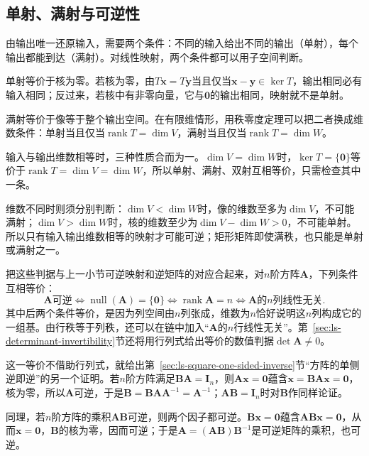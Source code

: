 \subsection{单射、满射与可逆性}
\label{sec:ls-injective-surjective-invertible}
由输出唯一还原输入，需要两个条件：不同的输入给出不同的输出（单射），每个输出都能到达（满射）。对线性映射，两个条件都可以用子空间判断。

单射等价于核为零。若核为零，由$T\bm x=T\bm y$当且仅当$\bm x-\bm y\in\ker T$，输出相同必有输入相同；反过来，若核中有非零向量，它与$\bm0$的输出相同，映射就不是单射。

满射等价于像等于整个输出空间。在有限维情形，用秩零度定理可以把二者换成维数条件：单射当且仅当$\operatorname{rank}T=\dim V$，满射当且仅当$\operatorname{rank}T=\dim W$。

输入与输出维数相等时，三种性质合而为一。$\dim V=\dim W$时，$\ker T=\{\bm0\}$等价于$\operatorname{rank}T=\dim V=\dim W$，所以单射、满射、双射互相等价，只需检查其中一条。

维数不同时则须分别判断：$\dim V<\dim W$时，像的维数至多为$\dim V$，不可能满射；$\dim V>\dim W$时，核的维数至少为$\dim V-\dim W>0$，不可能单射。所以只有输入输出维数相等的映射才可能可逆；矩形矩阵即使满秩，也只能是单射或满射之一。

把这些判据与上一小节可逆映射和逆矩阵的对应合起来，对$n$阶方阵$\bm A$，下列条件互相等价：
\[
 \bm A\text{可逆}
 \iff\operatorname{null}(\bm A)=\{\bm0\}
 \iff\operatorname{rank}\bm A=n
 \iff\bm A\text{的}n\text{列线性无关}.
\]
其中后两个条件等价，是因为列空间由$n$列张成，维数为$n$恰好说明这$n$列构成它的一组基。由行秩等于列秩，还可以在链中加入“$\bm A$的$n$行线性无关”。第~\ref{sec:ls-determinant-invertibility}节还将用行列式给出等价的数值判据$\det\bm A\neq0$。

这一等价不借助行列式，就给出第~\ref{sec:ls-square-one-sided-inverse}节“方阵的单侧逆即逆”的另一个证明。若$n$阶方阵满足$\bm B\bm A=\bm I_n$，则$\bm A\bm x=\bm0$蕴含$\bm x=\bm B\bm A\bm x=\bm0$，核为零，所以$\bm A$可逆，于是$\bm B=\bm B\bm A\bm A^{-1}=\bm A^{-1}$；$\bm A\bm B=\bm I_n$时对$\bm B$作同样论证。

同理，若$n$阶方阵的乘积$\bm A\bm B$可逆，则两个因子都可逆。$\bm B\bm x=\bm0$蕴含$\bm A\bm B\bm x=\bm0$，从而$\bm x=\bm0$，$\bm B$的核为零，因而可逆；于是$\bm A=(\bm A\bm B)\bm B^{-1}$是可逆矩阵的乘积，也可逆。

